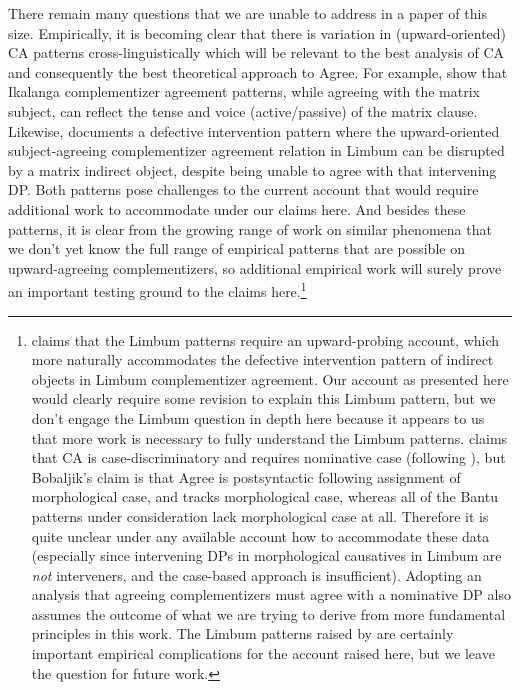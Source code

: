 There remain many questions that we are unable to address in a paper of this size. Empirically, it is becoming clear that there is variation in (upward-oriented) CA patterns cross-linguistically which will be relevant to the best analysis of CA and consequently the best theoretical approach to Agree. For example, \citet{LetsholoSafir:2017} show that Ikalanga complementizer agreement patterns, while agreeing with the matrix subject, can reflect the tense and voice (active/passive) of the matrix clause. Likewise, \citet{Nformi:2017} documents a defective intervention pattern where the upward-oriented subject-agreeing complementizer agreement relation in Limbum can be disrupted by a matrix indirect object, despite being unable to agree with that intervening DP. Both patterns pose challenges to the current account that would require additional work to accommodate under our claims here. And besides these patterns, it is clear from the growing range of work on similar phenomena that we don't yet know the full range of empirical patterns that are possible on upward-agreeing complementizers, so additional empirical work will surely prove an important testing ground to the claims here.\footnote{\citet{Nformi:2017} claims that the Limbum patterns require an upward-probing account, which more naturally accommodates the defective intervention pattern of indirect objects in Limbum complementizer agreement. Our account as presented here would clearly require some revision to explain this Limbum pattern, but we don't engage the Limbum question in depth here because it appears to us that more work is necessary to fully understand the Limbum patterns. \citet{Nformi:2017} claims that CA is case-discriminatory and requires nominative case (following \citealt{Bobaljik:2008}), but Bobaljik's claim is that Agree is postsyntactic following assignment of morphological case, and tracks morphological case, whereas all of the Bantu patterns under consideration lack morphological case at all. Therefore it is quite unclear under any available account how to accommodate these data (especially since intervening DPs in morphological causatives in Limbum are \textit{not} interveners, and the case-based approach is insufficient). Adopting an analysis that agreeing complementizers must agree with a nominative DP also assumes the outcome of what we are trying to derive from more fundamental principles in this work. The Limbum patterns raised by \citet{Nformi:2017} are certainly important empirical complications for the account raised here, but we leave the question for future work.} 

